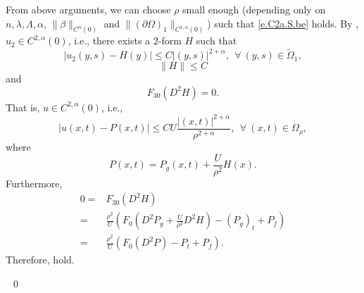\documentclass[preprint,12pt]{elsarticle}
\theoremstyle{definition}
\theoremstyle{remark}
\numberwithin{equation}{section}
\begin{document}
From above arguments, we can choose $\rho$ small enough (depending only on $n, \lambda,\Lambda,\alpha$, $\|\beta\|_{C^{\alpha}(0)}$ and $\|(\partial \Omega)_1\|_{C^{1,\alpha}(0)}$) such that \cref{e.C2a.S.be} holds. By , $u_2 \in C^{2,\alpha}(0)$, i.e., there exists a $2$-form $H$ such that
\begin{equation*}
  |u_2(y,s)-H(y)|\leq C |(y,s)|^{2+\alpha}, ~~\forall ~(y,s)\in \tilde \Omega_{1},
\end{equation*}
\begin{equation*}
  \|H\|\leq C
\end{equation*}
and
\begin{equation*}
  F_{30}(D^2 H)=0.
\end{equation*}
That is, $u\in C^{2,\alpha}(0)$, i.e.,
\begin{equation*}
  \left|u(x,t)-P(x,t)\right|\leq CU \frac{|(x,t)|^{2+\alpha}}{\rho^{2+\alpha}} , ~~\forall ~(x,t)\in \Omega_{\rho},
\end{equation*}
where
\begin{equation*}
P(x,t)=P_g(x,t)+\frac{U}{\rho^2}H(x).
\end{equation*}
Furthermore,
\begin{equation*}
  \begin{aligned}
    0=&F_{30}(D^2H)\\
    =& \frac{\rho^2}{U} \left(F_0\left(D^2P_g
    +\frac{U}{\rho^2} D^2H \right)-(P_g)_t+P_f\right)\\
    =&\frac{\rho^2}{U} \left(F_0\left(D^2 P\right)-P_t+P_f\right).
  \end{aligned}
\end{equation*}
Therefore,  hold.

~\qed~\\
\end{document}
